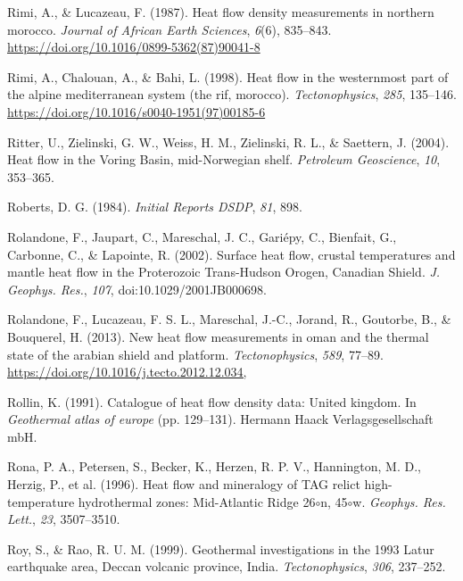 \begin{CSLReferences}{1}{1}
\leavevmode{}%
Rimi, A., \& Lucazeau, F. (1987). Heat flow density measurements in northern morocco. \emph{Journal of African Earth Sciences}, \emph{6}(6), 835--843. \url{https://doi.org/10.1016/0899-5362(87)90041-8}

\leavevmode{}%
Rimi, A., Chalouan, A., \& Bahi, L. (1998). Heat flow in the westernmost part of the alpine mediterranean system (the rif, morocco). \emph{Tectonophysics}, \emph{285}, 135--146. \url{https://doi.org/10.1016/s0040-1951(97)00185-6}

\leavevmode{}%
Ritter, U., Zielinski, G. W., Weiss, H. M., Zielinski, R. L., \& Saettern, J. (2004). Heat flow in the {V{o}ring Basin, mid-Norwegian shelf}. \emph{Petroleum Geoscience}, \emph{10}, 353--365.

\leavevmode{}%
Roberts, D. G. (1984). \emph{Initial Reports DSDP}, \emph{81}, 898.

\leavevmode{}%
Rolandone, F., Jaupart, C., Mareschal, J. C., Gariépy, C., Bienfait, G., Carbonne, C., \& Lapointe, R. (2002). Surface heat flow, crustal temperatures and mantle heat flow in the {Proterozoic Trans-Hudson Orogen, Canadian Shield}. \emph{J. Geophys. Res.}, \emph{107}, doi:10.1029/2001JB000698.

\leavevmode{}%
Rolandone, F., Lucazeau, F. S. L., Mareschal, J.-C., Jorand, R., Goutorbe, B., \& Bouquerel, H. (2013). New heat flow measurements in oman and the thermal state of the arabian shield and platform. \emph{Tectonophysics}, \emph{589}, 77--89. \url{https://doi.org/10.1016/j.tecto.2012.12.034,}

\leavevmode{}%
Rollin, K. (1991). Catalogue of heat flow density data: United kingdom. In \emph{Geothermal atlas of europe} (pp. 129--131). Hermann Haack Verlagsgesellschaft mbH.

\leavevmode{}%
Rona, P. A., Petersen, S., Becker, K., Herzen, R. P. V., Hannington, M. D., Herzig, P., et al. (1996). Heat flow and mineralogy of TAG relict high-temperature hydrothermal zones: {Mid-Atlantic Ridge} 26\(\circ\)n, 45\(\circ\)w. \emph{Geophys. Res. Lett.}, \emph{23}, 3507--3510.

\leavevmode{}%
Roy, S., \& Rao, R. U. M. (1999). Geothermal investigations in the 1993 {Latur} earthquake area, {Deccan} volcanic province, {India}. \emph{Tectonophysics}, \emph{306}, 237--252.


\end{CSLReferences}
